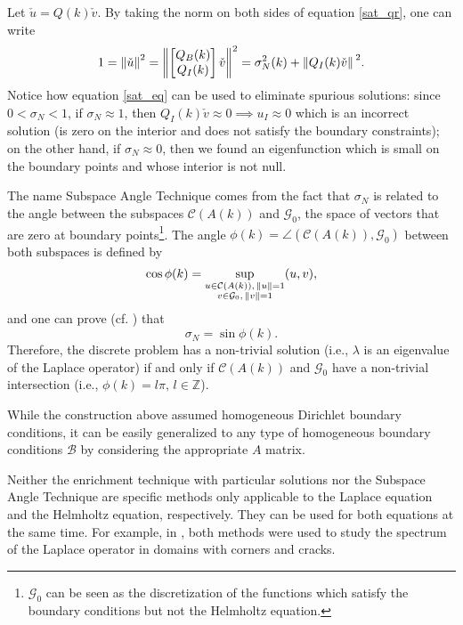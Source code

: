 Let \(\check{u} = Q(k) \check{v}\). By taking the norm on both sides of equation \eqref{sat_qr}, one can write
\begin{equation}\label{sat_eq}
    1 = \norm{\check{u}}^2 = \norm{\begin{bmatrix}
        Q_B(k)\\
        Q_I(k)
    \end{bmatrix}\check{v}}^2 = \sigma_N^2(k) + \norm*{Q_I(k) \check{v}}^2.
\end{equation}
Notice how equation \eqref{sat_eq} can be used to eliminate spurious solutions: since \(0 < \sigma_N < 1\), if \(\sigma_N \approx 1\), then \(Q_I(k) \check{v} \approx 0 \implies u_I \approx 0\) which is an incorrect solution (is zero on the interior and does not satisfy the boundary constraints); on the other hand, if \(\sigma_N \approx 0\), then we found an eigenfunction which is small on the boundary points and whose interior is not null.

The name Subspace Angle Technique comes from the fact that \(\sigma_N\) is related to the angle between the subspaces \(\mathcal{C}(A(k))\) and \(\mathcal{G}_0\), the space of vectors that are zero at boundary points\footnote{\(\mathcal{G}_0\) can be seen as the discretization of the functions which satisfy the boundary conditions but not the Helmholtz equation.}. The angle \(\phi(k)=\angle (\mathcal{C}(A(k)), \mathcal{G}_0)\) between both subspaces is defined by
\[
    \cos \phi(k) = \sup_{\substack{u \in \mathcal{C}(A(k)), \, \norm{u}=1 \\ v \in \mathcal{G}_0, \, \norm*{v} = 1}} (u, v),
\]
and one can prove (cf. \cite{betcke2005reviving}) that
\[
    \sigma_N = \sin \phi(k).
\]
Therefore, the discrete problem has a non-trivial solution (i.e., \(\lambda\) is an eigenvalue of the Laplace operator) if and only if \(\mathcal{C}(A(k))\) and \(\mathcal{G}_0\) have a non-trivial intersection (i.e., \(\phi(k) = l \pi, \, l \in \mathbb{Z}\)).

\begin{remark}
    While the construction above assumed homogeneous Dirichlet boundary conditions, it can be easily generalized to any type of homogeneous boundary conditions \(\mathcal{B}\) by considering the appropriate \(A\) matrix.
\end{remark}

\begin{remark}
    Neither the enrichment technique with particular solutions nor the Subspace Angle Technique are specific methods only applicable to the Laplace equation and the Helmholtz equation, respectively. They can be used for both equations at the same time. For example, in \cite{antunes2010meshfree}, both methods were used to study the spectrum of the Laplace operator in domains with corners and cracks.
\end{remark}
